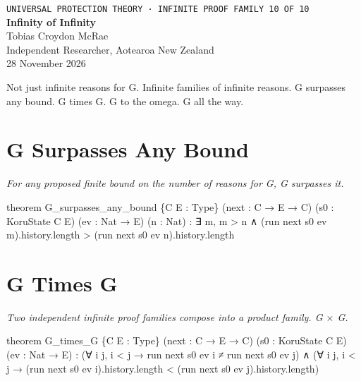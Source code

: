 




\begin{center}
{\small\texttt{UNIVERSAL PROTECTION THEORY · INFINITE PROOF FAMILY 10 OF 10}}\\[1.5em]
{\Huge\bfseries\color{korugreen} Infinity of Infinity}\\[1em]
{\large Tobias Croydon McRae}\\[0.3em]
{\small Independent Researcher, Aotearoa New Zealand}\\[0.3em]
{\small 28 November 2026}
\end{center}

\bigskip

\noindent Not just infinite reasons for G. Infinite families of infinite reasons. G surpasses any bound. G times G. G to the omega. G all the way.

\section{G Surpasses Any Bound}

\begin{theorembox}
\itshape For any proposed finite bound on the number of reasons for G, G surpasses it.
\end{theorembox}

\begin{leancode}
theorem G_surpasses_any_bound \{C E : Type\}
     (next : C → E → C) (s0 : KoruState C E)
     (ev : Nat → E) (n : Nat) :
     ∃ m, m > n ∧
         (run next s0 ev m).history.length >
         (run next s0 ev n).history.length
\end{leancode}

\axiombadge

\section{G Times G}

\begin{theorembox}
\itshape Two independent infinite proof families compose into a product family. G $\times$ G.
\end{theorembox}

\begin{leancode}
theorem G_times_G \{C E : Type\}
     (next : C → E → C) (s0 : KoruState C E)
     (ev : Nat → E) :
     (∀ i j, i < j → run next s0 ev i ≠ run next s0 ev j) ∧
     (∀ i j, i < j →
         (run next s0 ev i).history.length <
         (run next s0 ev j).history.length)
\end{leancode}


